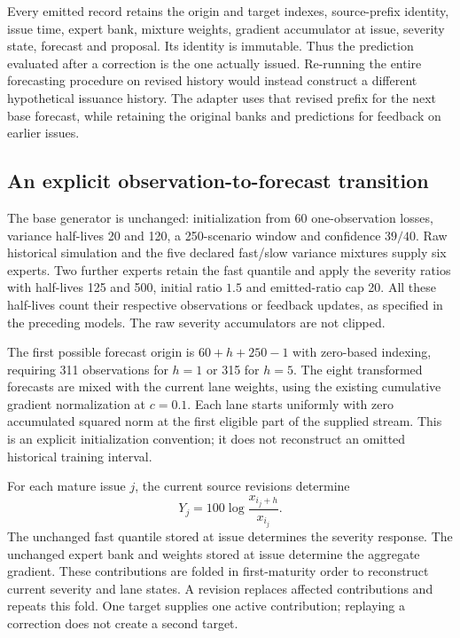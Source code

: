 \documentclass[11pt,a4paper]{article}
\theoremstyle{definition}\newtheorem{definition}[theorem]{Definition}
\begin{document}
Every emitted record retains the origin and target indexes, source-prefix identity, issue time, expert bank, mixture weights, gradient accumulator at issue, severity state, forecast and proposal. Its identity is immutable. Thus the prediction evaluated after a correction is the one actually issued. Re-running the entire forecasting procedure on revised history would instead construct a different hypothetical issuance history. The adapter uses that revised prefix for the next base forecast, while retaining the original banks and predictions for feedback on earlier issues.

\subsection{An explicit observation-to-forecast transition}
The base generator is unchanged: initialization from 60 one-observation losses, variance half-lives 20 and 120, a 250-scenario window and confidence $39/40$. Raw historical simulation and the five declared fast/slow variance mixtures supply six experts. Two further experts retain the fast quantile and apply the severity ratios with half-lives 125 and 500, initial ratio $1.5$ and emitted-ratio cap 20. All these half-lives count their respective observations or feedback updates, as specified in the preceding models. The raw severity accumulators are not clipped.

The first possible forecast origin is $60+h+250-1$ with zero-based indexing, requiring 311 observations for $h=1$ or 315 for $h=5$. The eight transformed forecasts are mixed with the current lane weights, using the existing cumulative gradient normalization at $c=0.1$. Each lane starts uniformly with zero accumulated squared norm at the first eligible part of the supplied stream. This is an explicit initialization convention; it does not reconstruct an omitted historical training interval.

For each mature issue $j$, the current source revisions determine
\begin{equation}
 Y_j=100\log\frac{x_{i_j+h}}{x_{i_j}}.
 \label{eq:streamloss}
\end{equation}
The unchanged fast quantile stored at issue determines the severity response. The unchanged expert bank and weights stored at issue determine the aggregate gradient. These contributions are folded in first-maturity order to reconstruct current severity and lane states. A revision replaces affected contributions and repeats this fold. One target supplies one active contribution; replaying a correction does not create a second target.
\end{document}
